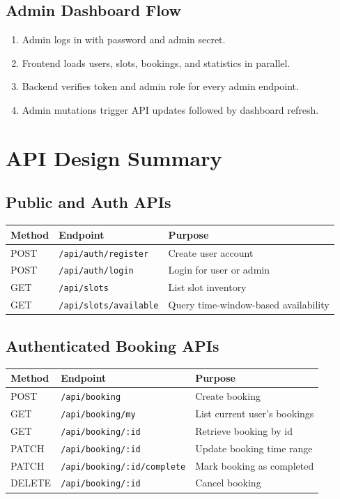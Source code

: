 \documentclass[12pt,a4paper]{article}
\begin{document}
\subsection{Admin Dashboard Flow}
\begin{enumerate}
    \item Admin logs in with password and admin secret.
    \item Frontend loads users, slots, bookings, and statistics in parallel.
    \item Backend verifies token and admin role for every admin endpoint.
    \item Admin mutations trigger API updates followed by dashboard refresh.
\end{enumerate}

\section{API Design Summary}
\subsection{Public and Auth APIs}
\begin{longtable}{p{} p{} p{}}
\toprule
\textbf{Method} & \textbf{Endpoint} & \textbf{Purpose} \\
\midrule
POST & \texttt{/api/auth/register} & Create user account \\
POST & \texttt{/api/auth/login} & Login for user or admin \\
GET & \texttt{/api/slots} & List slot inventory \\
GET & \texttt{/api/slots/available} & Query time-window-based availability \\
\bottomrule
\end{longtable}

\subsection{Authenticated Booking APIs}
\begin{longtable}{p{} p{} p{}}
\toprule
\textbf{Method} & \textbf{Endpoint} & \textbf{Purpose} \\
\midrule
POST & \texttt{/api/booking} & Create booking \\
GET & \texttt{/api/booking/my} & List current user's bookings \\
GET & \texttt{/api/booking/:id} & Retrieve booking by id \\
PATCH & \texttt{/api/booking/:id} & Update booking time range \\
PATCH & \texttt{/api/booking/:id/complete} & Mark booking as completed \\
DELETE & \texttt{/api/booking/:id} & Cancel booking \\
\bottomrule
\end{longtable}
\end{document}
